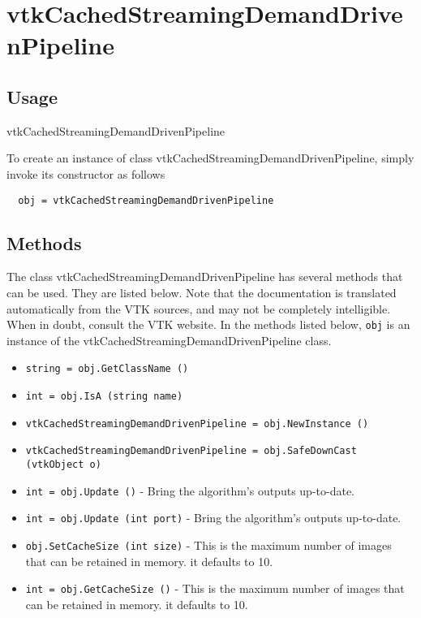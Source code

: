 \section{vtkCachedStreamingDemandDrivenPipeline}

\subsection{Usage}

 vtkCachedStreamingDemandDrivenPipeline

To create an instance of class vtkCachedStreamingDemandDrivenPipeline, simply
invoke its constructor as follows
\begin{verbatim}
  obj = vtkCachedStreamingDemandDrivenPipeline
\end{verbatim}
\subsection{Methods}

The class vtkCachedStreamingDemandDrivenPipeline has several methods that can be used.
  They are listed below.
Note that the documentation is translated automatically from the VTK sources,
and may not be completely intelligible.  When in doubt, consult the VTK website.
In the methods listed below, \verb|obj| is an instance of the vtkCachedStreamingDemandDrivenPipeline class.
\begin{itemize}
\item  \verb|string = obj.GetClassName ()|

\item  \verb|int = obj.IsA (string name)|

\item  \verb|vtkCachedStreamingDemandDrivenPipeline = obj.NewInstance ()|

\item  \verb|vtkCachedStreamingDemandDrivenPipeline = obj.SafeDownCast (vtkObject o)|

\item  \verb|int = obj.Update ()| -  Bring the algorithm's outputs up-to-date.

\item  \verb|int = obj.Update (int port)| -  Bring the algorithm's outputs up-to-date.

\item  \verb|obj.SetCacheSize (int size)| -  This is the maximum number of images that can be retained in memory.
 it defaults to 10.

\item  \verb|int = obj.GetCacheSize ()| -  This is the maximum number of images that can be retained in memory.
 it defaults to 10.

\end{itemize}
